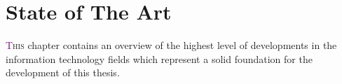 \chapter{State of The Art} \label{chap:stateOfTheArt}

\lettrine[lines=4]{\textcolor{purple}{T}}{his} chapter contains an overview of the highest level of developments in the information technology fields 
which represent a solid foundation for the development of this thesis.
